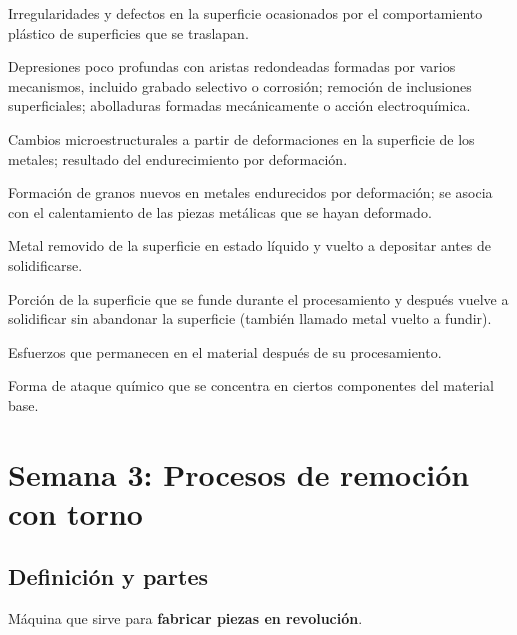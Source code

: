 \documentclass[12pt,a4paper]{article}
\begin{document}
\begin{description}[leftmargin=0pt,style=nextline]
	\item[Traslapes, pliegues y costuras] Irregularidades y defectos en la
	      superficie ocasionados por el comportamiento plástico de superficies que
	      se
	      traslapan.
	\item[Picaduras] Depresiones poco profundas con aristas redondeadas formadas
	      por varios mecanismos, incluido grabado selectivo o corrosión; remoción
	      de
	      inclusiones superficiales; abolladuras formadas mecánicamente o acción
	      electroquímica.
	\item[Deformación plástica] Cambios microestructurales a partir de
	      deformaciones en la superficie de los metales; resultado del
	      endurecimiento por
	      deformación.
	\item[Recristalización] Formación de granos nuevos en metales endurecidos por
	      deformación; se asocia con el calentamiento de las piezas metálicas que
	      se hayan
	      deformado.
	\item[Metal redepositado] Metal removido de la superficie en estado líquido y
	      vuelto a depositar antes de solidificarse.
	\item[Metal resolidificado] Porción de la superficie que se funde durante el
	      procesamiento y después vuelve a solidificar sin abandonar la superficie
	      (también llamado metal vuelto a fundir).
	\item[Esfuerzos residuales] Esfuerzos que permanecen en el material después de
	      su procesamiento.
	\item[Grabado selectivo] Forma de ataque químico que se concentra en ciertos
	      componentes del material base.
\end{description}

\section{Semana 3: Procesos de remoción con torno}

\subsection{Definición y partes}
\begin{defi}[Torno]
	Máquina que sirve para \textbf{fabricar piezas en revolución}.
\end{defi}
\end{document}
